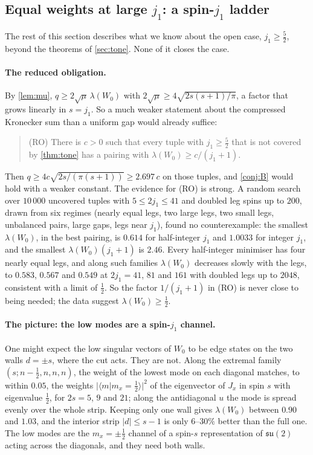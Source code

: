 \subsection{Equal weights at large \texorpdfstring{$j_1$}{j1}: a spin-\texorpdfstring{$j_1$}{j1} ladder}\label{subsec:ladder}

The rest of this section describes what we know about the open case,
$j_1\ge\frac52$, beyond the theorems of \cref{sec:tone}. None of it closes the case.

\paragraph{The reduced obligation.}
By \cref{lem:mu}, $q\ge2\sqrt\mu\,\lambda(W_0)$ with $2\sqrt\mu\ge4\sqrt{2s(s+1)/\pi}$, a
factor that grows linearly in $s=j_1$. So a much weaker statement about the compressed
Kronecker sum than a uniform gap would already suffice:
\begin{quote}
\textup{(RO)} There is $c>0$ such that every tuple with $j_1\ge\frac52$ that is not
covered by \cref{thm:tone} has a pairing with $\lambda(W_0)\ge c/(j_1+1)$.
\end{quote}
Then $q\ge4c\sqrt{2s/(\pi(s+1))}\ge2.697\,c$ on those tuples, and
\cref{conj:B} would hold with a weaker constant. The evidence for (RO) is strong. A
random search over $10\,000$ uncovered tuples with $5\le2j_1\le41$ and doubled leg spins
up to $200$, drawn from six regimes (nearly equal legs, two large legs, two small legs,
unbalanced pairs, large gaps, legs near $j_1$), found no counterexample: the smallest
$\lambda(W_0)$, in the best pairing, is $0.614$ for half-integer $j_1$ and $1.0033$ for
integer $j_1$, and the smallest $\lambda(W_0)(j_1+1)$ is $2.46$. Every half-integer minimiser
has four nearly equal legs, and along such families $\lambda(W_0)$ decreases slowly with the
legs, to $0.583$, $0.567$ and $0.549$ at $2j_1=41$, $81$ and $161$ with doubled legs up to
$2048$, consistent with a limit of $\frac12$. So the factor $1/(j_1+1)$ in (RO) is never
close to being needed; the data suggest $\lambda(W_0)\ge\frac12$.

\paragraph{The picture: the low modes are a spin-$j_1$ channel.}
One might expect the low singular vectors of $W_0$ to be edge states on the two walls
$d=\pm s$, where the cut acts. They are not. Along the extremal family
$(s;n-\frac12,n,n,n)$, the weight of the lowest mode on each diagonal matches, to within
$0.05$, the weights $|\langle m|m_x=\frac12\rangle|^2$ of the eigenvector of $J_x$ in spin
$s$ with eigenvalue $\frac12$, for $2s=5$, $9$ and $21$; along the antidiagonal $u$ the mode
is spread evenly over the whole strip. Keeping only one wall gives $\lambda(W_0)$ between
$0.90$ and $1.03$, and the interior strip $|d|\le s-1$ is only $6$--$30\%$ better than the
full one. The low modes are the $m_x=\pm\frac12$ channel of a spin-$s$ representation of
$\mathfrak{su}(2)$ acting across the diagonals, and they need both walls.

